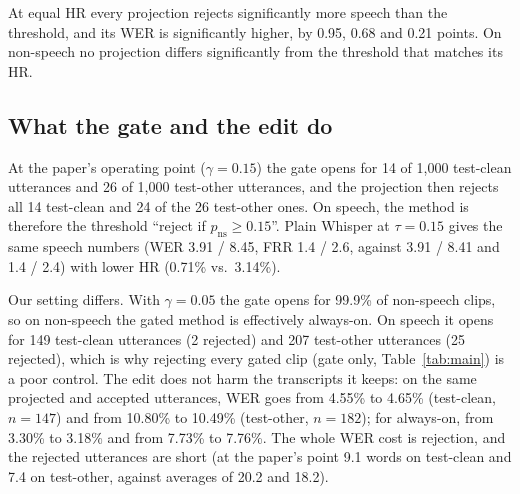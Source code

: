 \documentclass[conference,a4paper]{IEEEtran}
\newcommand{\pns}{p_{\mathrm{ns}}}
\begin{document}
At equal HR every projection rejects significantly more speech than the threshold, and its WER is significantly higher, by 0.95, 0.68 and 0.21 points. On non-speech no projection differs significantly from the threshold that matches its HR.

\subsection{What the gate and the edit do}
At the paper's operating point ($\gamma = 0.15$) the gate opens for 14 of 1,000 test-clean utterances and 26 of 1,000 test-other utterances, and the projection then rejects all 14 test-clean and 24 of the 26 test-other ones. On speech, the method is therefore the threshold ``reject if $\pns \ge 0.15$''. Plain Whisper at $\tau = 0.15$ gives the same speech numbers (WER 3.91 / 8.45, FRR 1.4 / 2.6, against 3.91 / 8.41 and 1.4 / 2.4) with lower HR (0.71\% vs.\ 3.14\%).

Our setting differs. With $\gamma = 0.05$ the gate opens for 99.9\% of non-speech clips, so on non-speech the gated method is effectively always-on. On speech it opens for 149 test-clean utterances (2 rejected) and 207 test-other utterances (25 rejected), which is why rejecting every gated clip (gate only, Table~\ref{tab:main}) is a poor control. The edit does not harm the transcripts it keeps: on the same projected and accepted utterances, WER goes from 4.55\% to 4.65\% (test-clean, $n = 147$) and from 10.80\% to 10.49\% (test-other, $n = 182$); for always-on, from 3.30\% to 3.18\% and from 7.73\% to 7.76\%. The whole WER cost is rejection, and the rejected utterances are short (at the paper's point 9.1 words on test-clean and 7.4 on test-other, against averages of 20.2 and 18.2).
\end{document}
